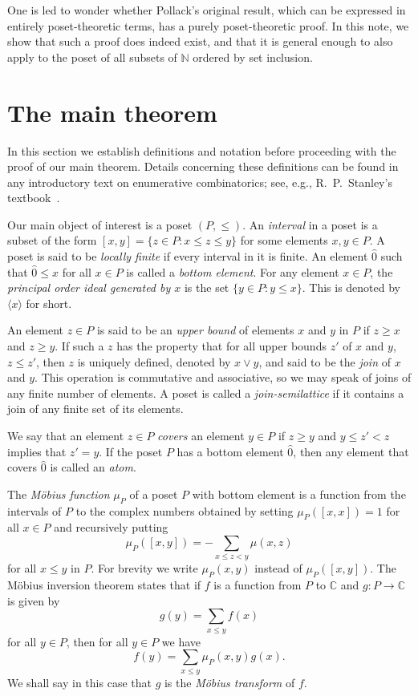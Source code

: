 \documentclass[11pt]{amsart}
\theoremstyle{myexample}
\theoremstyle{myremark}
\theoremstyle{conjecture}
\numberwithin{equation}{section}
\def\bottom{\widehat 0}
\def\ideal#1{\langle #1\rangle}
\def\CC{\mathbb{C}}
\def\NN{\mathbb{N}}
\begin{document}
One is led to wonder whether Pollack's original result, which can be
expressed in entirely poset-theoretic terms, has a purely poset-theoretic proof.
In this note, we show that such a proof does indeed exist,
and that it is general enough to also apply to the poset of all subsets of $\NN$ ordered by set inclusion.

\section{The main theorem}

In this section we establish definitions and notation before proceeding with the proof of our main theorem.
Details concerning these definitions can be found in any introductory text on enumerative
combinatorics; see, e.g., R.~P.~Stanley's textbook~\cite{enumcomb}.

Our main object of interest is a poset $(P,\le)$. An {\it interval} in a poset is a subset of
the form $[x,y] = \{ z\in P : x\le z\le y\}$ for some elements $x,y\in P$.
A poset is said to be {\it locally finite}
if every interval in it is finite. An element $\bottom$ such that $\bottom \le x$ for all $x\in P$
is called a {\it bottom element}. For any element $x\in P$, the {\it principal order ideal generated by $x$}
is the set $\{y\in P : y\le x\}$. This is denoted by $\ideal x$ for short.

An element $z\in P$ is said to be an {\it upper bound} of elements $x$ and $y$ in $P$ if $z\ge x$ and $z\ge y$.
If such a $z$ has the property that for all upper bounds $z'$ of $x$ and $y$, $z\le z'$, then $z$ is uniquely
defined, denoted by $x\vee y$, and said to be the {\it join} of $x$ and $y$. This operation is commutative
and associative, so we may speak of joins of any finite number of elements. A poset is called a
{\it join-semilattice} if it contains a join of any finite set of its elements.

We say that an element $z\in P$ {\it covers} an element $y\in P$ if $z\ge y$ and $y \le z' < z$ implies that
$z' = y$. If the poset $P$ has a bottom element $\bottom$, then any element that covers $\bottom$ is called an
{\it atom}.

The {\it M\"obius function} $\mu_P$ of a poset $P$ with bottom element
is a function from the intervals of $P$ to the complex numbers obtained by setting
$\mu_P([x,x]) = 1$ for all $x\in P$ and recursively putting
$$\mu_P([x,y]) = -\sum_{x\le z<y} \mu(x,z)$$
for all $x\le y$ in $P$. For brevity we write $\mu_P(x,y)$ instead of $\mu_P([x,y])$. The M\"obius inversion theorem
states that if $f$ is a function from $P$ to $\CC$ and $g:P\to \CC$ is given by
$$ g(y) = \sum_{x\le y} f(x)$$
for all $y\in P$, then for all $y\in P$ we have
$$ f(y) = \sum_{x\le y} \mu_P(x,y) g(x).$$
We shall say in this case that $g$ is the {\it M\"obius transform} of $f$.
\end{document}
